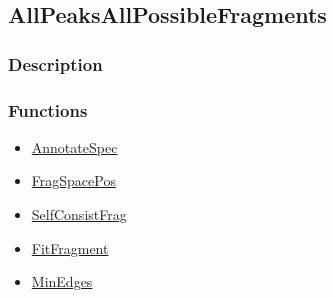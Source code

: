 \subsection{AllPeaksAllPossibleFragments}\label{AllPeaksAllPossibleFragments}
\subsubsection{Description}


\subsubsection{Functions}
\begin{itemize}
\item \hyperref[AnnotateSpec]{AnnotateSpec}
\item \hyperref[FragSpacePos]{FragSpacePos}
\item \hyperref[SelfConsistFrag]{SelfConsistFrag}
\item \hyperref[FitFragment]{FitFragment}
\item \hyperref[MinEdges]{MinEdges}
\end{itemize}

